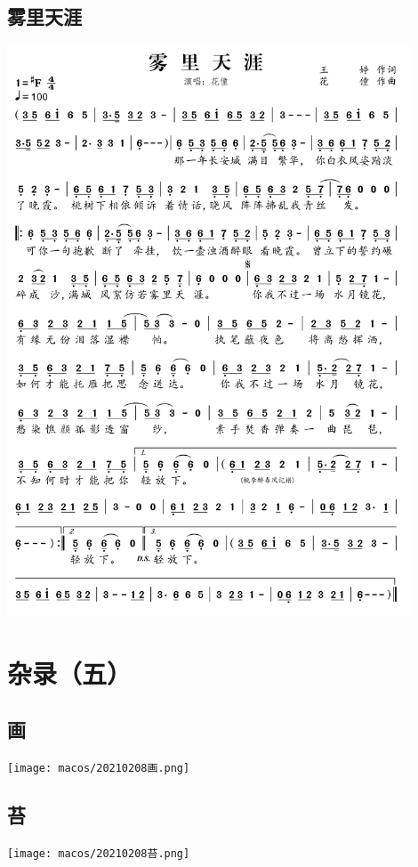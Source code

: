 \documentclass[cn,pad,twocol]{elegantbook}
\begin{document}
\section{雾里天涯} \includegraphics[width=0.9\textwidth]{rpi400/20210212雾里天涯.png}

\chapter{杂录（五）}
\section{画} \texttt{[image: macos/20210208画.png]}
\section{苔} \texttt{[image: macos/20210208苔.png]}
\end{document}
